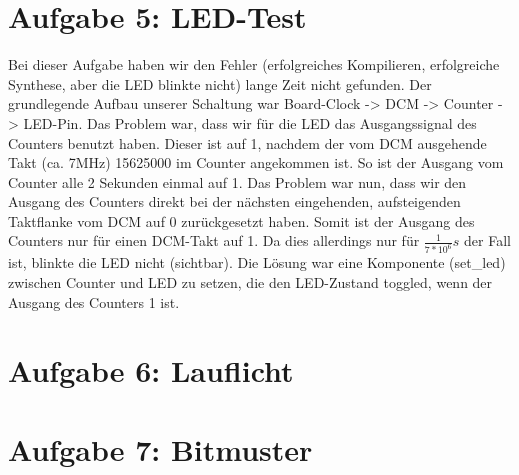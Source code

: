 \documentclass[parskip=full]{scrartcl}
\begin{document}
	\section*{Aufgabe 5: LED-Test}
		\setcounter{section}{5}
		\setcounter{subsection}{0}
		Bei dieser Aufgabe haben wir den Fehler (erfolgreiches Kompilieren, erfolgreiche Synthese, aber die LED blinkte nicht) lange Zeit nicht gefunden. Der grundlegende Aufbau unserer Schaltung war Board-Clock -> DCM -> Counter -> LED-Pin. Das Problem war, dass wir für die LED das Ausgangssignal des Counters benutzt haben. Dieser ist auf 1, nachdem der vom DCM ausgehende Takt (ca. 7MHz) 15625000 im Counter angekommen ist. So ist der Ausgang vom Counter alle 2 Sekunden einmal auf 1. Das Problem war nun, dass wir den Ausgang des Counters direkt bei der nächsten eingehenden, aufsteigenden Taktflanke vom DCM auf 0 zurückgesetzt haben. Somit ist der Ausgang des Counters nur für einen DCM-Takt auf 1. Da dies allerdings nur für $\frac{1}{7*10^6}s$ der Fall ist, blinkte die LED nicht (sichtbar). Die Lösung war eine Komponente (set\_led) zwischen Counter und LED zu setzen, die den LED-Zustand toggled, wenn der Ausgang des Counters 1 ist.
	\section*{Aufgabe 6: Lauflicht}
	\section*{Aufgabe 7: Bitmuster}
	
	
\end{document}
